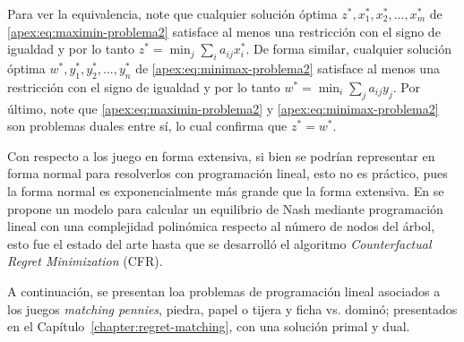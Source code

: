 Para ver la equivalencia, note que cualquier solución óptima $z^*, x_1^*, x_2^*, ..., x_m^*$ de \ref{apex:eq:maximin-problema2} satisface al menos una restricción con el signo de igualdad y por lo tanto $z^* = \min_j \sum_i a_{ij}x_i^*$. De forma similar, cualquier solución óptima $w^*, y_1^*, y_2^*, ..., y_n^*$ de \ref{apex:eq:minimax-problema2} satisface al menos una restricción con el signo de igualdad y por lo tanto $w^* = \min_i \sum_j a_{ij}y_j$. Por último, note que \ref{apex:eq:maximin-problema2} y \ref{apex:eq:minimax-problema2} son problemas duales entre sí, lo cual confirma que $z^* = w^*$.

Con respecto a los juego en forma extensiva, si bien se podrían representar en forma normal para resolverlos con programación lineal, esto no es práctico, pues la forma normal es exponencialmente más grande que la forma extensiva. En \cite{bib:algoritmo-pl} se propone un modelo para calcular un equilibrio de Nash mediante programación lineal con una complejidad polinómica respecto al número de nodos del árbol, esto fue el estado del arte hasta que se desarrolló el algoritmo \textit{Counterfactual Regret Minimization} (CFR).

A continuación, se presentan loa problemas de programación lineal asociados a los juegos \textit{matching pennies}, piedra, papel o tijera y ficha vs. dominó; presentados en el Capítulo~\ref{chapter:regret-matching}, con una solución primal y dual.

